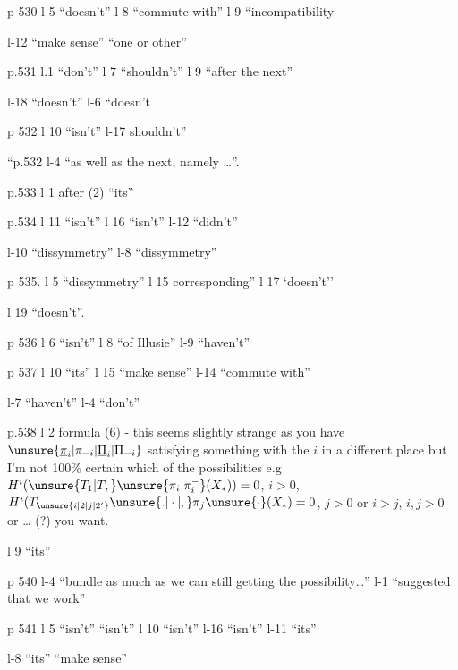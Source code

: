 p 530 l 5 ``doesn't'' \quad l 8  ``commute with'' \quad l 9 ``incompatibility

l-12 ``make sense'' ``one or other''

p.531 l.1 ``don't'' \quad l 7 ``shouldn't'' \quad l 9 ``after the next''

l-18 ``doesn't'' \quad l-6 ``doesn't

p 532 l 10 ``isn't'' \quad l-17 shouldn't'' \quad {}



``p.532 l-4 ``as well as the next, namely \ldots{}''.

p.533 l 1 after (2) ``its''

p.534 l 11 ``isn't'' \quad l 16 ``isn't'' \quad l-12 ``didn't''

l-10 ``dissymmetry'' \quad l-8 ``dissymmetry''

p 535. l 5 ``dissymmetry'' \quad l 15 corresponding'' \quad l 17 `doesn't''

l 19 ``doesn't''.

p 536 l 6 ``isn't'' \quad l 8 ``of Illusie'' \quad l-9 ``haven't''

p 537 l 10 ``its'' \quad l 15 ``make sense'' \quad l-14 ``commute with''

l-7 ``haven't'' \quad l-4 ``don't''

p.538 l 2 formula (6) - this seems slightly strange as you have $\unsure{\underline{\pi}_{i}|\pi_{-i}|\underline{\Pi}_{i}|\Pi_{-i}}$ satisfying something with the $i$ in a different place but I'm not 100\% certain  which of the possibilities e.g $H^{i}(\unsure{T_{1}|T,}\unsure{\pi_{i}|\pi_{i}^{-}}(X_{\ast}))=0$, $i>0$, $H^{i}(T_{\unsure{i|2|j|2'}}{\unsure{.|\cdot|,}}\pi_{j}\unsure{\cdot}(X_{\ast})=0$, $j>0$ or $i>j$,  \unsure{,}$i,j>0$ or \ldots{} (?) you want.

l 9 ``its''

p 540  l-4 ``bundle as much as we can   still getting the possibility\ldots'' \quad l-1 ``suggested that we work''

p 541 l 5 ``isn't'' ``isn't'' \quad l 10 ``isn't'' \quad l-16 ``isn't'' \quad l-11 ``its''

l-8 ``its''  ``make sense''

